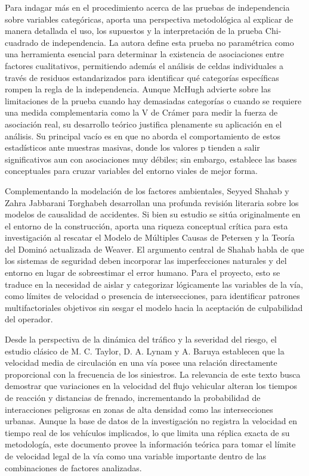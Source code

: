\documentclass[12pt]{article}
\begin{document}
Para indagar más en el procedimiento acerca de las pruebas de independencia sobre variables categóricas, \textcite{McHugh2013} aporta una perspectiva metodológica al explicar de manera detallada el uso, los supuestos y la interpretación de la prueba Chi-cuadrado de independencia. La autora define esta prueba no paramétrica como una herramienta esencial para determinar la existencia de asociaciones entre factores cualitativos, permitiendo además el análisis de celdas individuales a través de residuos estandarizados para identificar qué categorías específicas rompen la regla de la independencia. Aunque McHugh advierte sobre las limitaciones de la prueba cuando hay demasiadas categorías o cuando se requiere una medida complementaria como la V de Crámer para medir la fuerza de asociación real, su desarrollo teórico justifica plenamente su aplicación en el análisis. Su principal vacío es en que no aborda el comportamiento de estos estadísticos ante muestras masivas, donde los valores p tienden a salir significativos aun con asociaciones muy débiles; sin embargo, establece las bases conceptuales para cruzar variables del entorno viales de mejor forma.

Complementando la modelación de los factores ambientales, Seyyed Shahab y Zahra Jabbarani Torghabeh desarrollan una profunda revisión literaria sobre los modelos de causalidad de accidentes. Si bien su estudio se sitúa originalmente en el entorno de la construcción, aporta una riqueza conceptual crítica para esta investigación al rescatar el Modelo de Múltiples Causas de Petersen y la Teoría del Dominó actualizada de Weaver. El argumento central de Shahab habla de que los sistemas de seguridad deben incorporar las imperfecciones naturales y del entorno en lugar de sobreestimar el error humano. Para el proyecto, esto se traduce en la necesidad de aislar y categorizar lógicamente las variables de la vía, como límites de velocidad o presencia de intersecciones, para identificar patrones multifactoriales objetivos sin sesgar el modelo hacia la aceptación de culpabilidad del operador.

Desde la perspectiva de la dinámica del tráfico y la severidad del riesgo, el estudio clásico de M. C. Taylor, D. A. Lynam y A. Baruya establecen que la velocidad media de circulación en una vía posee una relación directamente proporcional con la frecuencia de los siniestros. La relevancia de este texto busca demostrar que variaciones en la velocidad del flujo vehicular alteran los tiempos de reacción y distancias de frenado, incrementando la probabilidad de interacciones peligrosas en zonas de alta densidad como las intersecciones urbanas. Aunque la base de datos de la investigación no registra la velocidad en tiempo real de los vehículos implicados, lo que limita una réplica exacta de su metodología, este documento provee la información teórica para tomar el límite de velocidad legal de la vía como una variable importante dentro de las combinaciones de factores analizadas.
\end{document}

